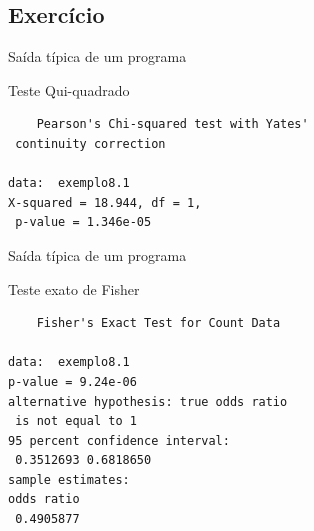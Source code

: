 \documentclass{beamer}
\begin{document}



\subsection{Exercício}

\begin{frame}[fragile]{Saída típica de um programa}
  \begin{block}{Teste Qui-quadrado}
\begin{verbatim}
	Pearson's Chi-squared test with Yates'
 continuity correction

data:  exemplo8.1
X-squared = 18.944, df = 1,
 p-value = 1.346e-05
\end{verbatim}
  \end{block}
\end{frame}

\begin{frame}[fragile]{Saída típica de um programa}
  \begin{block}{Teste exato de Fisher}
\begin{verbatim}
	Fisher's Exact Test for Count Data

data:  exemplo8.1
p-value = 9.24e-06
alternative hypothesis: true odds ratio
 is not equal to 1
95 percent confidence interval:
 0.3512693 0.6818650
sample estimates:
odds ratio
 0.4905877
\end{verbatim}
  \end{block}
\end{frame}
\end{document}
